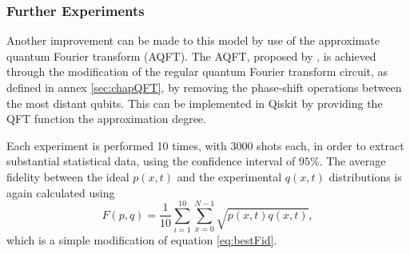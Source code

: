 \documentclass[../../dissertation.tex]{subfiles}
\begin{document}
\subsubsection{Further Experiments}
Another improvement can be made to this model by use of the approximate quantum
Fourier transform (AQFT). The AQFT, proposed by \cite{Coppersmith94}, is
achieved through the modification of the regular quantum Fourier transform
circuit, as defined in annex \ref{sec:chapQFT}, by removing the phase-shift
operations between the most distant qubits. This can be implemented in Qiskit
by providing the QFT function the approximation degree.\par

Each experiment is performed 10 times, with $3000$ shots each, in order to
extract substantial statistical data, using the confidence interval of $95\%$.
The average fidelity between the ideal $p(x,t)$ and the experimental $q(x,t)$
distributions is again calculated using
\begin{equation}
    F(p,q) = \frac{1}{10}\sum_{i = 1}^{10} \sum_{x=0}^{N-1} \sqrt{p(x,t)q(x,t)},
    \label{eq:avgFid}
\end{equation}
which is a simple modification of equation \ref{eq:bestFid}.\par
\end{document}
